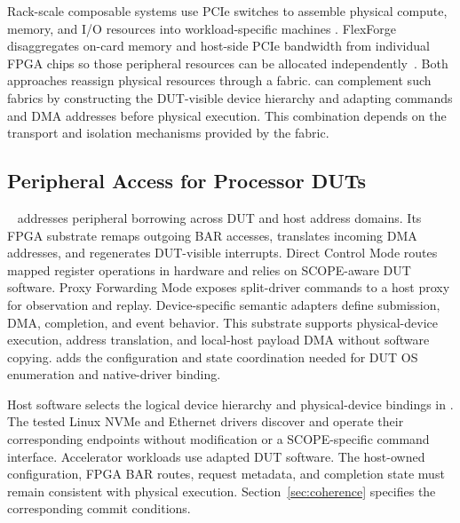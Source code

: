 Rack-scale composable systems use PCIe switches to assemble physical compute,
memory, and I/O resources into workload-specific machines
\cite{li2017composable}. FlexForge disaggregates on-card memory and host-side
PCIe bandwidth from individual FPGA chips so those peripheral resources can be
allocated independently~\cite{lim2024flexforge}. Both approaches reassign
physical resources through a fabric. \sys can complement such fabrics by
constructing the DUT-visible device hierarchy and adapting commands and
DMA addresses before physical execution. This combination depends on
the transport and isolation mechanisms provided by the fabric.

\subsection{Peripheral Access for Processor DUTs}

\sysprevious~\cite{scope2026fpt} addresses peripheral borrowing across DUT and
host address domains. Its FPGA substrate remaps outgoing BAR accesses,
translates incoming DMA addresses, and regenerates DUT-visible interrupts.
Direct Control Mode routes mapped register operations in hardware and relies
on SCOPE-aware DUT software. Proxy Forwarding Mode exposes split-driver
commands to a host proxy for observation and replay. Device-specific semantic
adapters define submission, DMA, completion, and event behavior. This
substrate supports physical-device execution, address translation, and
local-host payload DMA without software copying. \sys adds the configuration
and state coordination needed for DUT OS enumeration and native-driver binding.

Host software selects the logical device hierarchy and physical-device
bindings in \sys. The tested Linux NVMe and Ethernet drivers discover and
operate their corresponding endpoints without modification or a
SCOPE-specific command interface. Accelerator workloads use adapted DUT
software. The host-owned
configuration, FPGA BAR routes, request metadata, and completion state
must remain consistent with physical execution. Section~\ref{sec:coherence}
specifies the corresponding commit conditions.
